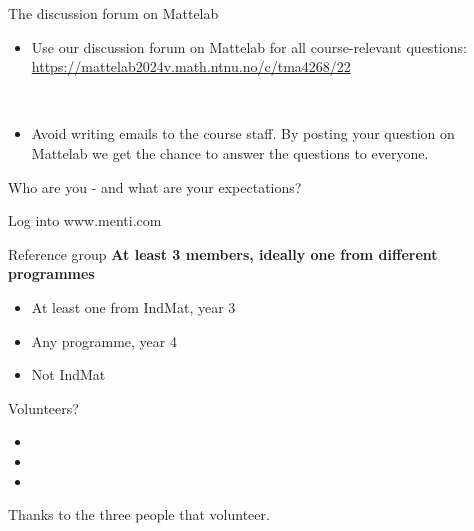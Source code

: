 \documentclass[
  10pt,
  ignorenonframetext,
]{beamer}
\providecommand{\tightlist}{%
  \setlength{\itemsep}{0pt}\setlength{\parskip}{0pt}}
\begin{document}
\begin{frame}
\begin{block}{The discussion forum on Mattelab}
\protect\hypertarget{the-discussion-forum-on-mattelab}{}
\(~\)

\begin{itemize}
\tightlist
\item
  Use our discussion forum on Mattelab for all course-relevant
  questions: \url{https://mattelab2024v.math.ntnu.no/c/tma4268/22}
\end{itemize}

\(~\)

\begin{itemize}
\tightlist
\item
  Avoid writing emails to the course staff. By posting your question on
  Mattelab we get the chance to answer the questions to everyone.
\end{itemize}
\end{block}
\end{frame}

\begin{frame}{Who are you - and what are your expectations?}
\protect\hypertarget{who-are-you---and-what-are-your-expectations}{}
\(~\)

Log into www.menti.com
\end{frame}

\begin{frame}{Reference group}
\protect\hypertarget{reference-group}{}
\textbf{At least 3 members, ideally one from different programmes}

\begin{itemize}
\tightlist
\item
  At least one from IndMat, year 3
\item
  Any programme, year 4
\item
  Not IndMat
\end{itemize}

Volunteers?

\begin{itemize}
\tightlist
\item
\item
\item
\end{itemize}

Thanks to the three people that volunteer.
\end{frame}
\end{document}
